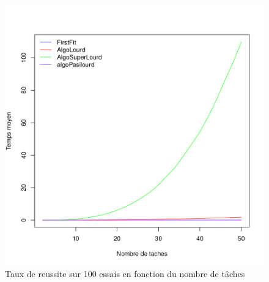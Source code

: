 \documentclass[11pt]{article}
\begin{document}
\begin{figure}[!ht]
    \center
    \includegraphics[scale = 0.5]{temps_moyen}
    \caption{Taux de reussite sur 100 essais en fonction du nombre de tâches}
\end{figure}
\end{document}
